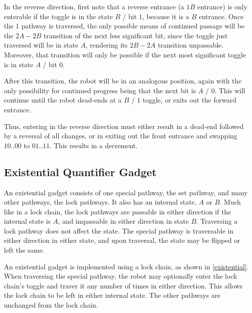 \documentclass[11pt]{article}
\begin{document}
In the reverse direction, first note that a reverse entrance (a $1B$ entrance) is only enterable 
if the toggle is in the state $B$ / bit $1$, because it is a $B$ entrance. Once the $1$ pathway is traversed,
the only possible means of continued passage will be the $2A - 2B$ transition of the next less significant
bit, since the toggle just traversed will be in state $A$, rendering its $2B - 2A$ transition unpassable.
Moreover, that transition will only be possible if the next most significant toggle is in state $A$ / bit $0$.

After this transition, the robot will be in an analogous position, again with the only possibility for
continued progress being that the next bit is $A$ / $0$. This will continue until the robot dead-ends at
a $B$ / $1$ toggle, or exits out the forward entrance.

Thus, entering in the reverse direction must either result in a dead-end followed by a reversal of all changes,
or in exiting out the front entrance and swapping $10..00$ to $01..11$. This results in a decrement.

\subsection{Existential Quantifier Gadget}
An existential gadget consists of one special pathway, the set pathway, and many other pathways, the
lock pathways. It also has an internal state, $A$ or $B$. Much like in a lock chain, the lock pathways are
passable in either direction if the internal state is $A$, and impassable in either direction in state $B$.
Traversing a lock pathway does not affect the state. The special pathway is traversable in either direction
in either state, and upon traversal, the state may be flipped or left the same.

An existential gadget is implemented using a lock chain, as shown in \ref{existential}. When traversing
the special pathway, the robot may optionally enter the lock chain's toggle and traver it any number of times
in either direction. This allows the lock chain to be left in either internal state. The other pathways are
unchanged from the lock chain.

\end{document}
